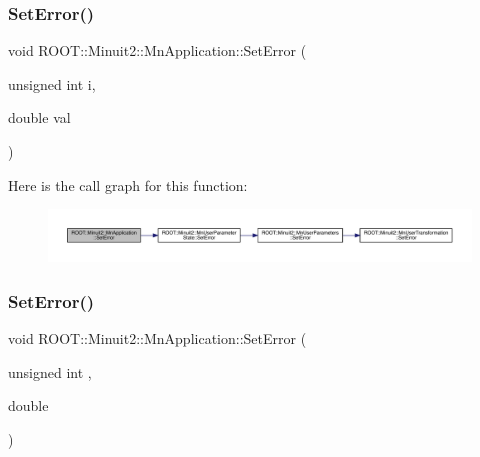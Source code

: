 \subsubsection{\texorpdfstring{SetError()}{SetError()}\hspace{0.1cm}{\footnotesize\ttfamily [1/4]}}
{\footnotesize\ttfamily void R\+O\+O\+T\+::\+Minuit2\+::\+Mn\+Application\+::\+Set\+Error (\begin{DoxyParamCaption}\item[{unsigned int}]{i,  }\item[{double}]{val }\end{DoxyParamCaption})}

Here is the call graph for this function\+:\nopagebreak
\begin{figure}[H]
\begin{center}
\leavevmode
\includegraphics[width=350pt]{df/dd5/classROOT_1_1Minuit2_1_1MnApplication_a04e02c59439b7c638cea29938030b2f8_cgraph}
\end{center}
\end{figure}
\mbox{\label{classROOT_1_1Minuit2_1_1MnApplication_a04e02c59439b7c638cea29938030b2f8}} 
\subsubsection{\texorpdfstring{SetError()}{SetError()}\hspace{0.1cm}{\footnotesize\ttfamily [2/4]}}
{\footnotesize\ttfamily void R\+O\+O\+T\+::\+Minuit2\+::\+Mn\+Application\+::\+Set\+Error (\begin{DoxyParamCaption}\item[{unsigned int}]{,  }\item[{double}]{ }\end{DoxyParamCaption})}

\mbox{\label{classROOT_1_1Minuit2_1_1MnApplication_ac47d9b0517cbc38dc0237e4dc654a807}} 
